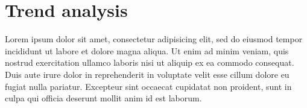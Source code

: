 \section{Trend analysis}
Lorem ipsum dolor sit amet, consectetur adipisicing elit, sed do eiusmod
tempor incididunt ut labore et dolore magna aliqua. Ut enim ad minim veniam,
quis nostrud exercitation ullamco laboris nisi ut aliquip ex ea commodo consequat.
Duis aute irure dolor in reprehenderit in voluptate velit esse cillum dolore eu 
fugiat nulla pariatur. Excepteur sint occaecat cupidatat non proident,
sunt in culpa qui officia deserunt mollit anim id est laborum.


